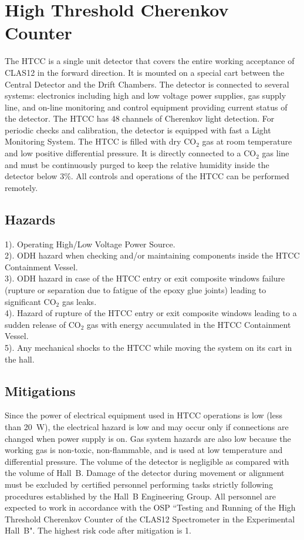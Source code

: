 \section{High Threshold Cherenkov Counter}

The HTCC is a single unit detector that covers the entire working acceptance of CLAS12 
in the forward direction. It is mounted on a special cart between the Central Detector 
and the Drift Chambers. The detector is connected to several systems: electronics including 
high and low voltage power supplies, gas supply line, and on-line monitoring and control 
equipment providing current status of the detector. The HTCC has 48 channels of Cherenkov 
light detection. For periodic checks and calibration, the detector is equipped with fast a 
Light Monitoring System. The HTCC is filled with dry CO$_2$ gas at room temperature and 
low positive differential pressure. It is directly connected to a CO$_2$ gas line and must 
be continuously purged to keep the relative humidity inside the detector below 3\%. All 
controls and operations of the HTCC can be performed remotely.
 
\subsection{Hazards} 

1). Operating High/Low Voltage Power Source. \\
2). ODH hazard when checking and/or maintaining components inside the HTCC Containment Vessel.\\
3). ODH hazard in case of the HTCC entry or exit composite windows failure (rupture or 
separation due to fatigue of the epoxy glue joints) leading to significant CO$_2$ gas leaks.\\
4). Hazard of rupture of the HTCC entry or exit composite windows leading to a sudden release of 
CO$_2$ gas with energy accumulated in the HTCC Containment Vessel.\\
5). Any mechanical shocks to the HTCC while moving the system on its cart in the hall.

\subsection{Mitigations}

Since the power of electrical equipment used in HTCC operations is low (less than 20~W), the 
electrical hazard is low and may occur only if connections are changed when power supply is on.
Gas system hazards are also low because the working gas is non-toxic, non-flammable, and is 
used at low temperature and differential pressure. The volume of the detector is negligible as 
compared with the volume of Hall~B. Damage of the detector during movement or alignment must be 
excluded by certified personnel performing tasks strictly following procedures established by 
the Hall~B Engineering Group. All personnel are expected to work in accordance with the OSP 
``Testing and Running of the High Threshold Cherenkov Counter of the CLAS12 Spectrometer in the 
Experimental Hall~B". The highest risk code after mitigation is 1.

